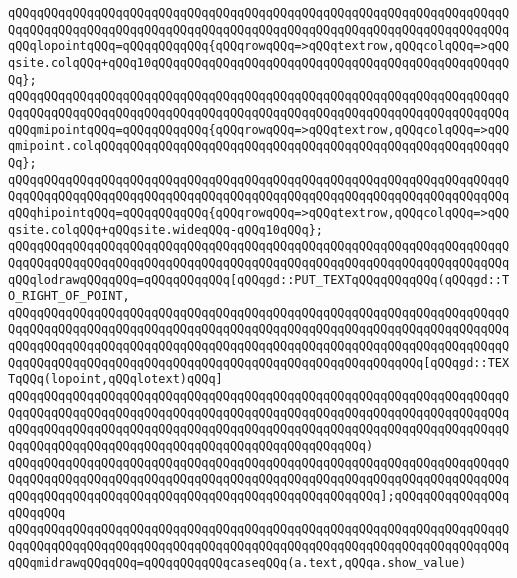 \newline
\verb|qQQqqQQqqQQqqQQqqQQqqQQqqQQqqQQqqQQqqQQqqQQqqQQqqQQqqQQqqQQqqQQqqQQqqQQqqQQqqQQqqQQqqQQqqQQqqQQqqQQqqQQqqQQqqQQqqQQqqQQqqQQqqQQqqQQqqQQqqQQqqQQqlopointqQQq=qQQqqQQqqQQq{qQQqrowqQQq=>qQQqtextrow,qQQqcolqQQq=>qQQqsite.colqQQq+qQQq10qQQqqQQqqQQqqQQqqQQqqQQqqQQqqQQqqQQqqQQqqQQqqQQqqQQq};|\newline
\verb|qQQqqQQqqQQqqQQqqQQqqQQqqQQqqQQqqQQqqQQqqQQqqQQqqQQqqQQqqQQqqQQqqQQqqQQqqQQqqQQqqQQqqQQqqQQqqQQqqQQqqQQqqQQqqQQqqQQqqQQqqQQqqQQqqQQqqQQqqQQqqQQqmipointqQQq=qQQqqQQqqQQq{qQQqrowqQQq=>qQQqtextrow,qQQqcolqQQq=>qQQqmipoint.colqQQqqQQqqQQqqQQqqQQqqQQqqQQqqQQqqQQqqQQqqQQqqQQqqQQqqQQqqQQq};|\newline
\verb|qQQqqQQqqQQqqQQqqQQqqQQqqQQqqQQqqQQqqQQqqQQqqQQqqQQqqQQqqQQqqQQqqQQqqQQqqQQqqQQqqQQqqQQqqQQqqQQqqQQqqQQqqQQqqQQqqQQqqQQqqQQqqQQqqQQqqQQqqQQqqQQqhipointqQQq=qQQqqQQqqQQq{qQQqrowqQQq=>qQQqtextrow,qQQqcolqQQq=>qQQqsite.colqQQq+qQQqsite.wideqQQq-qQQq10qQQq};|\newline
\newline
\newline
\verb|qQQqqQQqqQQqqQQqqQQqqQQqqQQqqQQqqQQqqQQqqQQqqQQqqQQqqQQqqQQqqQQqqQQqqQQqqQQqqQQqqQQqqQQqqQQqqQQqqQQqqQQqqQQqqQQqqQQqqQQqqQQqqQQqqQQqqQQqqQQqqQQqlodrawqQQqqQQq=qQQqqQQqqQQq[qQQqgd::PUT_TEXTqQQqqQQqqQQq(qQQqgd::TO_RIGHT_OF_POINT,|\newline
\verb|qQQqqQQqqQQqqQQqqQQqqQQqqQQqqQQqqQQqqQQqqQQqqQQqqQQqqQQqqQQqqQQqqQQqqQQqqQQqqQQqqQQqqQQqqQQqqQQqqQQqqQQqqQQqqQQqqQQqqQQqqQQqqQQqqQQqqQQqqQQqqQQqqQQqqQQqqQQqqQQqqQQqqQQqqQQqqQQqqQQqqQQqqQQqqQQqqQQqqQQqqQQqqQQqqQQqqQQqqQQqqQQqqQQqqQQqqQQqqQQqqQQqqQQqqQQqqQQqqQQqqQQqqQQq[qQQqgd::TEXTqQQq(lopoint,qQQqlotext)qQQq]|\newline
\verb|qQQqqQQqqQQqqQQqqQQqqQQqqQQqqQQqqQQqqQQqqQQqqQQqqQQqqQQqqQQqqQQqqQQqqQQqqQQqqQQqqQQqqQQqqQQqqQQqqQQqqQQqqQQqqQQqqQQqqQQqqQQqqQQqqQQqqQQqqQQqqQQqqQQqqQQqqQQqqQQqqQQqqQQqqQQqqQQqqQQqqQQqqQQqqQQqqQQqqQQqqQQqqQQqqQQqqQQqqQQqqQQqqQQqqQQqqQQqqQQqqQQqqQQqqQQqqQQqqQQq)|\newline
\verb|qQQqqQQqqQQqqQQqqQQqqQQqqQQqqQQqqQQqqQQqqQQqqQQqqQQqqQQqqQQqqQQqqQQqqQQqqQQqqQQqqQQqqQQqqQQqqQQqqQQqqQQqqQQqqQQqqQQqqQQqqQQqqQQqqQQqqQQqqQQqqQQqqQQqqQQqqQQqqQQqqQQqqQQqqQQqqQQqqQQqqQQqqQQqqQQq];qQQqqQQqqQQqqQQqqQQqqQQq|\newline
\newline
\verb|qQQqqQQqqQQqqQQqqQQqqQQqqQQqqQQqqQQqqQQqqQQqqQQqqQQqqQQqqQQqqQQqqQQqqQQqqQQqqQQqqQQqqQQqqQQqqQQqqQQqqQQqqQQqqQQqqQQqqQQqqQQqqQQqqQQqqQQqqQQqqQQqmidrawqQQqqQQq=qQQqqQQqqQQqcaseqQQq(a.text,qQQqa.show_value)|\newline
